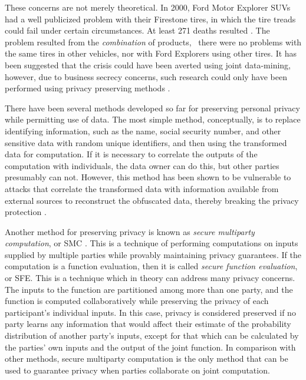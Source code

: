 These concerns are not merely theoretical. In 2000, Ford Motor Explorer
SUVs had a well publicized problem with their Firestone tires, in
which the tire treads could fail under certain circumstances. At least
271 deaths resulted \cite{NYTFordFirestone}. The problem resulted
from the \emph{combination} of products, \ie ~there were no problems with
the same tires in other vehicles, nor with Ford Explorers using other
tires. It has been suggested that the crisis could have been averted
using joint data-mining, however, due to business secrecy concerns,
such research could only have been performed using privacy preserving methods
\cite{VaidyaClifton:2002}.

There have been several methods developed so far for preserving personal
privacy while permitting use of data. The most simple method, conceptually,
is to replace identifying information, such as the name, social security
number, and other sensitive data with random unique identifiers, and
then using the transformed data for computation. If it is necessary
to correlate the outputs of the computation with individuals, the
data owner can do this, but other parties presumably can not. However,
this method has been shown to be vulnerable to attacks that correlate
the transformed data with information available from external sources
to reconstruct the obfuscated data, thereby breaking the privacy protection
\cite{Malin04}. 

Another method for preserving privacy is known as \emph{secure multiparty
computation}, or SMC \cite{Yao86}. This is a technique of performing computations on inputs
supplied by multiple parties while provably maintaining privacy guarantees.
If the computation is a function evaluation, then it is called \emph{secure
function evaluation}, or SFE. This is a technique which in theory can address
many privacy concerns. The inputs to
the function are partitioned among more than one party, and the function
is computed collaboratively while preserving the privacy of each participant's
individual inputs. In this case, privacy is considered preserved if
no party learns any information that would affect their estimate of
the probability distribution of another party's inputs, except for
that which can be calculated by the parties' own inputs and the output
of the joint function. In comparison with other methods, secure
multiparty computation is the only method that can be used to guarantee privacy when parties
collaborate on joint computation. %
\begin{comment}
%
\begin{lyxgreyedout}
Needs clarification
\end{lyxgreyedout}
 In other words, the entropy gain of each party is equivalent to the
entropy gain in an idealized protocol where a trusted third party
collects all the inputs, evaluates the function, and transmits only
the output to each party. Depending on the protocol, the guarantees
for some parties may be based on typical assumptions of computational
hardness, while the guarantees for other parties may be information
theoretic.
\end{comment}
{}

